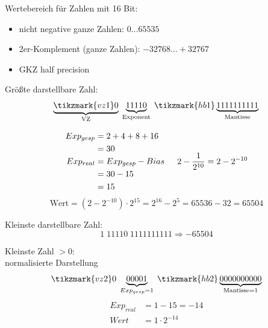 \documentclass[10pt,a4paper]{scrartcl}
\begin{document}
\noindent
Wertebereich für Zahlen mit 16 Bit:
\begin{itemize}
	\item nicht negative ganze Zahlen: $ 0\ldots65535 $
	\item 2er-Komplement (ganze Zahlen): $ -32768\ldots+32767 $
	\item \ac{GKZ} half precision
\end{itemize}

Größte darstellbare Zahl:\\
\begin{equation*}
\underbrace{\tikzmark{vz1}0}_{\text{VZ}}\; \underbrace{11110}_{\text{Exponent}}\; \tikzmark{hb1} \underbrace{1111111111}_{\text{Mantisse}}\\
\end{equation*}

\begin{equation*}
\begin{aligned}
Exp_{gesp} &= 2+4+8+16 \\
&= 30\\
Exp_{real} &= Exp_{gesp}-Bias\\
&= 30-15 \\&= 15
\end{aligned}
\indent 2-\dfrac{1}{2^{10}} = 2-2^{-10}
\end{equation*}
\begin{equation*}
\text{Wert} = (2-2^{-10})\cdot 2^{15} = 2^{16}-2^{5}=65536-32=65504
\end{equation*}

Kleinste darstellbare Zahl:
\begin{equation*}
1 \; 11110 \; 1111111111 \Rightarrow -65504
\end{equation*}

Kleinste Zahl $>$0:\\
\indent normalisierte Darstellung
\begin{equation*}
	\tikzmark{vz2}0\; \underbrace{00001}_{Exp_{gesp}=1}\; \tikzmark{hb2} \underbrace{0000000000}_{\text{Mantisse} = 1}
\end{equation*}
\begin{align*}
Exp_{real} &= 1-15 = -14\\
Wert &=1\cdot2^{-14}
\end{align*}
\end{document}
